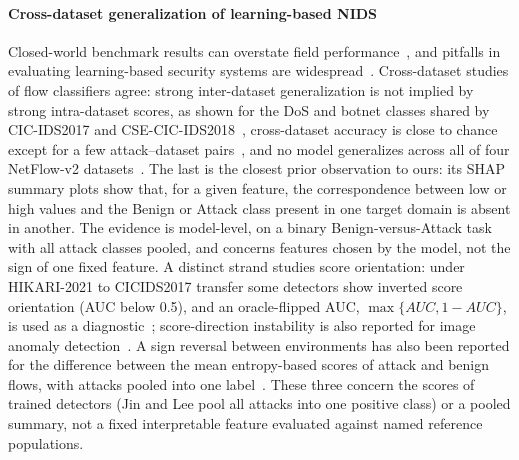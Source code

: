 \documentclass[preprint,12pt]{elsarticle}
\begin{document}
\paragraph{Cross-dataset generalization of learning-based NIDS} Closed-world benchmark results can overstate field performance~\cite{sommer2010closedworld}, and pitfalls in evaluating learning-based security systems are widespread~\cite{arp2022dosdonts}. Cross-dataset studies of flow classifiers agree: strong inter-dataset generalization is not implied by strong intra-dataset scores, as shown for the DoS and botnet classes shared by CIC-IDS2017 and CSE-CIC-IDS2018~\cite{dhooge2020inter}, cross-dataset accuracy is close to chance except for a few attack--dataset pairs~\cite{cantone2024crossdataset}, and no model generalizes across all of four NetFlow-v2 datasets~\cite{layeghy2022generalisability}. The last is the closest prior observation to ours: its SHAP summary plots show that, for a given feature, the correspondence between low or high values and the Benign or Attack class present in one target domain is absent in another. The evidence is model-level, on a binary Benign-versus-Attack task with all attack classes pooled, and concerns features chosen by the model, not the sign of one fixed feature. A distinct strand studies score orientation: under HIKARI-2021 to CICIDS2017 transfer some detectors show inverted score orientation (AUC below 0.5), and an oracle-flipped AUC, $\max\{AUC,1-AUC\}$, is used as a diagnostic~\cite{jin2026benchmark}; score-direction instability is also reported for image anomaly detection~\cite{ascarate2026score}. A sign reversal between environments has also been reported for the difference between the mean entropy-based scores of attack and benign flows, with attacks pooled into one label~\cite{bouke2026entropy}. These three concern the scores of trained detectors (Jin and Lee pool all attacks into one positive class) or a pooled summary, not a fixed interpretable feature evaluated against named reference populations.
\end{document}
